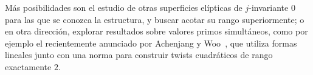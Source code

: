 \documentclass[a4paper]{book}
\theoremstyle{definition}
\theoremstyle{plain}
\newcommand{\nbd}{\nobreakdash}
\begin{document}
Más posibilidades son el estudio de otras superficies elípticas de $j$\nbd-invariante $0$ para las que se conozca la estructura, y buscar acotar su rango superiormente; o en otra dirección, explorar resultados sobre valores primos simultáneos, como por ejemplo el recientemente anunciado por Achenjang y Woo~\cite{AchenjangWoo2026}, que utiliza formas lineales junto con una norma para construir twists cuadráticos de rango exactamente $2$. 


































 
\end{document}

